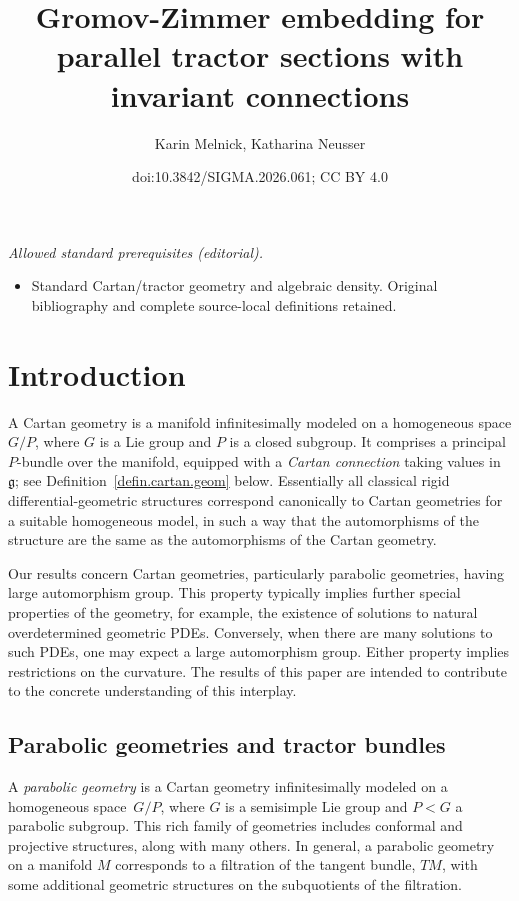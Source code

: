\documentclass[10pt,a4paper]{amsart}
\title{Gromov-Zimmer embedding for parallel tractor sections with invariant connections}
\author{Karin Melnick, Katharina Neusser}
\date{doi:10.3842/SIGMA.2026.061; CC BY 4.0}
\numberwithin{equation}{section}
\theoremstyle{definition}
\newcommand{\lieg}{\mathfrak{g}}
\begin{document}
\maketitle
\noindent\textit{Allowed standard prerequisites (editorial).}\begin{itemize}
\item Standard Cartan/tractor geometry and algebraic density. Original bibliography and complete source-local definitions retained.
\end{itemize}\medskip
\section{Introduction}
A Cartan geometry is a manifold infinitesimally modeled on a
homogeneous space $G/P$, where $G$ is a Lie group and $P$ is a closed
subgroup. It comprises a principal $P$-bundle over the manifold,
equipped with a \emph{Cartan connection} taking values in $\lieg$; see Definition~\ref{defin.cartan.geom} below. Essentially all classical
rigid differential-geometric structures correspond canonically to
Cartan geometries for a suitable homogeneous model, in such a way that the
automorphisms of the structure are the same as the automorphisms of
the Cartan geometry.

Our results concern Cartan geometries, particularly parabolic geometries, having large
automorphism group. This property typically implies further special properties of the geometry, for example,
the existence of solutions to natural overdetermined geometric PDEs. Conversely,
when there are many solutions to such PDEs, one may expect a large automorphism group. Either property implies restrictions on the curvature. The results of this paper are intended to contribute to the concrete understanding of this interplay.

\subsection{Parabolic geometries and tractor bundles}
\label{sec.intro.tractor}

A \emph{parabolic geometry} is a Cartan geometry infinitesimally modeled
on a homogeneous space~$G/P$, where $G$ is a semisimple Lie group and
$P < G$ a parabolic subgroup. This rich family of geometries includes
conformal and projective structures, along with many others. In general, a parabolic
geometry on a manifold $M$ corresponds to a filtration of the tangent
bundle, $TM$, with some additional geometric structures on the
subquotients of the filtration.
\end{document}
